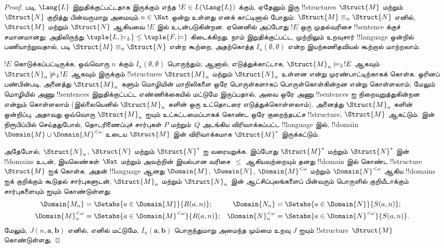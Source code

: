\documentclass[../../../include/open-logic-section]{subfiles}
\begin{document}
\begin{proof}
 படி, $\Lang{L}$ இறுதிக்குட்பட்டதாக இருக்கும்
எந்த $!E \in L(\Lang{L})$ க்கும், ஏதேனும் இரு !!{structure}s
$\Struct{M}$ மற்றும்~$\Struct{N}$ குறித்து பின்வருமாறு அமையும்
$n \in \Nat$ ஒன்று உள்ளது எனக் காட்டினால் போதும்:
$\Struct{M} \equiv_n \Struct{N}$ எனில், $\Struct{M}$ மற்றும்
$\Struct{N}$ ஆகியவை $!E$ இல் உடன்படுகின்றன. ஏனெனில் அப்போது
$!E$ ஒரு முதல்வரிசை !!{sentence} க்குச் சமானமானது; அதிலிருந்து
$\tuple{L, \models_L} \le \tuple{F, \models}$ கிடைக்கிறது.
நாம் இறுதிக்குட்பட்ட, முற்றிலும் உறவுசார் !!{language} ஒன்றில்
பணியாற்றுவதால்,  படி
$\Struct{M} \equiv_n \Struct{N}$ என்ற கூற்றை, அதற்கொத்த
$I_n(\emptyset,\emptyset)$ என்ற இயற்கணிதவியல் கூற்றால் மாற்றலாம்.

$!E$ கொடுக்கப்பட்டிருக்க, ஒவ்வொரு $n$ க்கும்
$I_n(\emptyset, \emptyset)$ பொருந்தும்; ஆனால், எடுத்துக்காட்டாக,
$\Struct{M}_n \models_L !E$ ஆகவும் $\Struct{N}_n \not\models_L !E$
ஆகவும் இருக்கும் !!{structure}s $\Struct{M}_n$ மற்றும்
$\Struct{N}_n$ உள்ளன என்று முரண்பாட்டிற்காகக் கொள்க.
ஓரினப் பண்பின்படி, அனைத்து $\Struct{M}_n$ களும் மொழியின்
மாறிலிகளை ஒரே பொருள்களாகப் பொருள்கொள்கின்றன என்று கொள்ளலாம்;
மேலும் மொழியில் அணு !!{sentence}s இறுதிக்குட்பட்ட எண்ணிக்கையில்
மட்டுமே இருப்பதால், அவை ஒரே அணு !!{sentence}s ஐ நிறைவுறுத்துகின்றன
என்றும் கொள்ளலாம் (இல்லையெனில் $\Struct{M}_n$ களின் ஒரு
உட்தொடரை எடுத்துக்கொள்ளலாம்). அனைத்து $\Struct{M}_n$ களின்
ஒன்றிப்பு, அதாவது ஒவ்வொரு $\Struct{M}_n$ ஐயும் உட்கட்டமைப்பாகக்
கொண்ட ஒரே குறைந்தபட்ச !!{structure}, $\Struct{M}$ ஆகட்டும்.
 இன் நிரூபிப்பில் செய்ததுபோல்,
தொடரிணைப்புச் சார்புகள் $P$ மற்றும்~$Q$ அடங்கிய விரிவாக்கப்பட்ட
!!{language} இல், !!{domain} $\Domain{M} \cup
\Domain{M}^{<\omega}$ உடைய $\Struct{M}$ இன் விரிவாக்கமாக
$\Struct{M}^*$ இருக்கட்டும்.

அதேபோல், $\Struct{N}_n$, $\Struct{N}$ மற்றும் $\Struct{N}^*$ ஐ
வரையறுக்க. இப்போது $\Struct{M}^*$ மற்றும் $\Struct{N}^*$ இன்
!!{domain}s உடன், இயலெண்கள்~$\Nat$ மற்றும் அவற்றின் இயல்பான
வரிசை~$\le$ ஆகியவற்றையும் தனது !!{domain} இல் கொண்ட
!!{structure} $\Struct{M}$ ஐக் கொள்க. அதன் !!{language} ஆனது
$\Domain{M}$, $\Domain{N}$, $\Domain{M}^{<\omega}$ மற்றும்
$\Domain{N}^{<\omega}$ ஆகிய !!{domain}s ஐக் குறிக்கும் கூடுதல்
சார்புகளுடன், $\Struct{M}_n$ மற்றும் $\Struct{N}_n$ இன்
ஆட்சிப்புலங்களைப் பின்வரும் பொருளில் குறியீடாக்கும் சார்புகளையும்
ஐயும் கொண்டுள்ளது:
\begin{align*}
  \Domain{M_n} & = \Setabs{a \in \Domain{M}}{R(a, n)}; & 
  \Domain{N_n} & = \Setabs{a \in \Domain{N}}{S(a,n)}; \\
  \Domain{M}^{<\omega}_n & = \Setabs{a \in \Domain{M}^{<\omega}}{R(a,n)}; &
  \Domain{N}^{<\omega}_n & = \Setabs{a \in \Domain{N}^{<\omega}}{S(a,n)}. 
\end{align*}
மேலும், $J(n, \mathbf{a}, \mathbf{b})$ எனில், எனில் மட்டுமே,
$I_n(\mathbf{a}, \mathbf{b})$ பொருந்துமாறு அமைந்த மும்மை உறவு
$J$ ஐயும் !!{structure}~$\Struct{M}$ கொண்டுள்ளது.


\end{proof}
\end{document}
